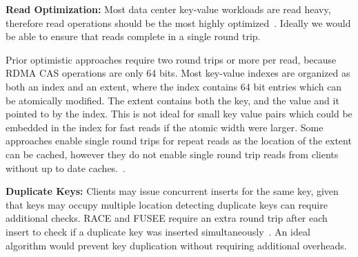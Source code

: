 \textbf{Read Optimization:} Most data center key-value
workloads are read heavy, therefore read operations should
be the most highly
optimized~\cite{datacenter-workloads,facebook-memcached}.
Ideally we would be able to ensure that reads complete in a
single round trip.

Prior optimistic approaches require two round trips or more
per read, because RDMA CAS operations are only 64 bits. Most
key-value indexes are organized as both an index and an
extent, where the index contains 64 bit entries which can be
atomically modified. The extent contains both the key, and
the value and it pointed to by the index. This is not ideal
for small key value pairs which could be embedded in the
index for fast reads if the atomic width were larger. Some
approaches enable single round trips for repeat reads as the
location of the extent can be cached, however they do not
enable single round trip reads from clients without up to
date caches.~\cite{clover}.



\textbf{Duplicate Keys:} Clients may issue concurrent
inserts for the same key, given that keys may occupy
multiple location detecting duplicate keys can require
additional checks. RACE and FUSEE require an extra round
trip after each insert to check if a duplicate key was
inserted simultaneously~\cite{race,fusee}.  An ideal
algorithm would prevent key duplication without requiring
additional overheads.